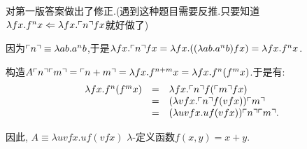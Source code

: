 \begin{solution}
{\color {red} {对第一版答案做出了修正.}}(遇到这种题目需要反推.只要知道$\lambda fx.f^n x \Leftarrow \lambda fx. \ulcorner{n}\urcorner fx$就好做了)

因为$\ulcorner{n}\urcorner \equiv \lambda ab.a^nb$,于是$\lambda fx. \ulcorner{n}\urcorner fx=\lambda fx. ((\lambda ab.a^nb)fx)=\lambda fx. f^nx$.

构造$A \ulcorner{n}\urcorner \ulcorner{m}\urcorner = \ulcorner{n+m}\urcorner =\lambda fx. f^{n+m}x= \lambda fx. f^n (f^m x)$.于是有:
\[
 \begin{array}{rcl}
  \lambda fx. f^n (f^m x) & = & \lambda fx. \ulcorner{n}\urcorner f (\ulcorner{m}\urcorner f x) \\
  & = & (\lambda vfx. \ulcorner{n}\urcorner f (vf x))\ulcorner{m}\urcorner \\
  & = & (\lambda uvfx. uf (vf x))\ulcorner{n}\urcorner\ulcorner{m}\urcorner.
 \end{array}
\]

因此, $A \equiv \lambda uvfx. uf(vfx)$ $\lambda$-定义函数$f(x,y)=x+y$.
\end{solution}